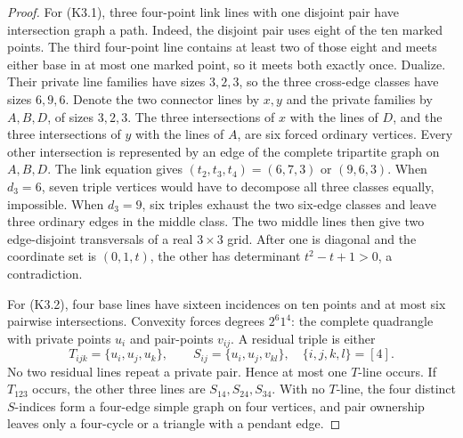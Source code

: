 \begin{proof}
For (K3.1), three four-point link lines with one disjoint pair have
intersection graph a path.  Indeed, the disjoint pair uses eight of the ten
marked points.  The third four-point line contains at least two of those
eight and meets either base in at most one marked point, so it meets both
 exactly once.  Dualize.  Their private line families have
 sizes $3,2,3$, so the three cross-edge classes have sizes $6,9,6$.
 Denote the two connector lines by $x,y$ and the private families by
 $A,B,D$, of sizes $3,2,3$.  The three intersections of $x$ with the lines
 of $D$, and the three intersections of $y$ with the lines of $A$, are six
 forced ordinary vertices.  Every other intersection is represented by an
 edge of the complete tripartite graph on $A,B,D$.  The link equation gives
 $(t_2,t_3,t_4)=(6,7,3)$ or $(9,6,3)$.
 When $d_3=6$, seven triple vertices would have to decompose all three
classes equally, impossible.  When $d_3=9$, six triples exhaust the two
six-edge classes and leave three ordinary edges in the middle class.  The
two middle lines then give two edge-disjoint transversals of a real
$3\times3$ grid.  After one is diagonal and the coordinate set is
$(0,1,t)$, the other has determinant
$t^2-t+1>0$, a contradiction.

For (K3.2), four base lines have sixteen incidences on ten points and at
most six pairwise intersections.  Convexity forces degrees $2^6 1^4$:
the complete quadrangle with private points $u_i$ and pair-points $v_{ij}$.
A residual triple is either
\[
T_{ijk}=\{u_i,u_j,u_k\},\qquad
S_{ij}=\{u_i,u_j,v_{kl}\},\quad\{i,j,k,l\}=[4].
\]
No two residual lines repeat a private pair.  Hence at most one $T$-line
occurs.  If $T_{123}$ occurs, the other three lines are
$S_{14},S_{24},S_{34}$.  With no $T$-line, the four distinct $S$-indices
form a four-edge simple graph on four vertices, and pair ownership leaves
only a four-cycle or a triangle with a pendant edge.


\end{proof}
